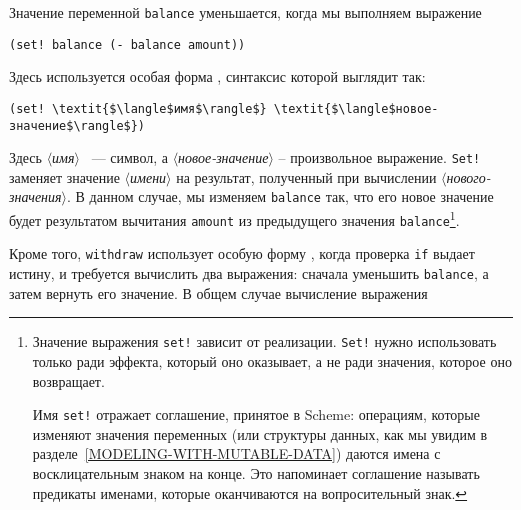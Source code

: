 Значение переменной {\tt balance} уменьшается, когда мы
выполняем выражение


\begin{Verbatim}[fontsize=\small]
(set! balance (- balance amount))
\end{Verbatim}
Здесь используется особая форма  ,
синтаксис которой выглядит так:

\begin{Verbatim}[fontsize=\small]
(set! \textit{$\langle$имя$\rangle$} \textit{$\langle$новое-значение$\rangle$})
\end{Verbatim}
Здесь
\textit{$\langle$имя$\rangle$} ~--- символ, а   \textit{$\langle$новое-значение$\rangle$} --
произвольное выражение. {\tt Set!} заменяет значение
\textit{$\langle$имени$\rangle$} на результат,
полученный при вычислении \textit{$\langle$нового-значения$\rangle$}.  В данном
случае, мы изменяем {\tt balance} так, что его новое значение
будет результатом вычитания {\tt amount} из предыдущего
значения {\tt balance}\footnote{Значение выражения {\tt set!} зависит
  от реализации. {\tt Set!} нужно использовать только ради
  эффекта, который оно оказывает, а  не ради значения, которое оно
  возвращает.

  Имя {\tt set!} отражает соглашение, принятое в
  Scheme: операциям, которые изменяют значения переменных (или структуры
  данных, как мы увидим в разделе~\ref{MODELING-WITH-MUTABLE-DATA})
  даются имена с восклицательным знаком на конце.  Это напоминает
  соглашение называть предикаты именами, которые оканчиваются на
  вопросительный знак.}.

Кроме того, {\tt withdraw} использует особую форму
,
когда проверка {\tt if} выдает истину, и требуется вычислить два
выражения: сначала уменьшить
{\tt balance}, а затем вернуть его значение.  В общем случае
вычисление выражения

